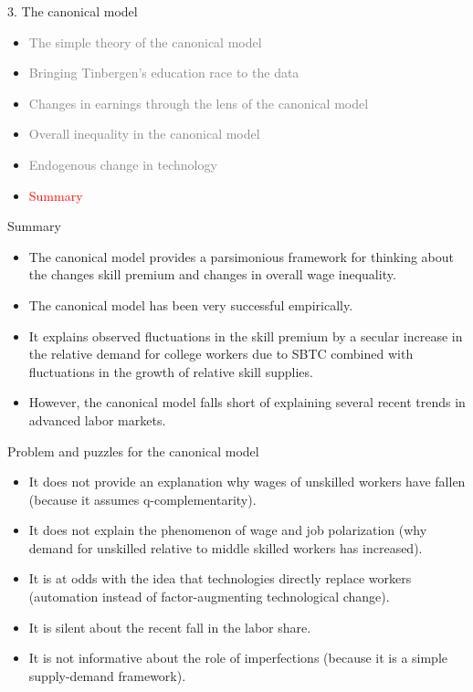 \documentclass[notes=show]{beamer}
\begin{document}
\begin{frame}{3. The canonical model}
\begin{itemize}
\item[\textcolor{gray}{3.1}] \textcolor{gray}{The simple theory of the canonical model} \medskip
\item[\textcolor{gray}{3.2}] \textcolor{gray}{Bringing Tinbergen's education race to the data} \medskip
\item[\textcolor{gray}{3.3}] \textcolor{gray}{Changes in earnings through the lens of the canonical model} \medskip
\item[\textcolor{gray}{3.4}] \textcolor{gray}{Overall inequality in the canonical model} \medskip
\item[\textcolor{gray}{3.5}] \textcolor{gray}{Endogenous change in technology} \medskip
\item[\textcolor{red}{3.6}] \textcolor{red}{Summary}
\end{itemize}
\end{frame}

\begin{frame}{Summary}
\begin{itemize}
\item The canonical model provides a parsimonious framework for thinking about the changes skill premium and changes in overall wage inequality. \medskip
\item The canonical model has been very successful empirically. \medskip
\item It explains observed fluctuations in the skill premium by a secular increase in the relative demand for college workers due to SBTC combined with fluctuations in the growth of relative skill supplies. \medskip
\item However, the canonical model falls short of explaining several recent trends in advanced labor markets.
\end{itemize}
\end{frame}

\begin{frame}{Problem and puzzles for the canonical model}
\begin{itemize}
\item It does not provide an explanation why wages of unskilled workers have fallen (because it assumes q-complementarity). \medskip 
\item It does not explain the phenomenon of wage and job polarization (why demand for unskilled relative to middle skilled workers has increased). \medskip
\item It is at odds with the idea that technologies directly replace workers (automation instead of factor-augmenting technological change).
\item It is silent about the recent fall in the labor share. \medskip
\item It is not informative about the role of imperfections (because it is a simple supply-demand framework).
\end{itemize}
\end{frame}
\end{document}
